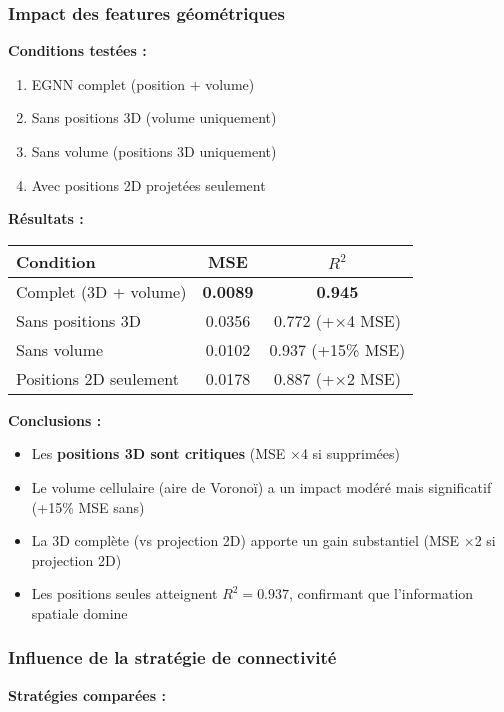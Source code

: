 \subsubsection{Impact des features géométriques}

\textbf{Conditions testées :}
\begin{enumerate}
    \item EGNN complet (position + volume)
    \item Sans positions 3D (volume uniquement)
    \item Sans volume (positions 3D uniquement)
    \item Avec positions 2D projetées seulement
\end{enumerate}

\textbf{Résultats :}
\begin{center}
\begin{tabular}{|l|c|c|}
\hline
\textbf{Condition} & \textbf{MSE} & \textbf{$R^2$} \\
\hline
Complet (3D + volume) & \textbf{0.0089} & \textbf{0.945} \\
Sans positions 3D & 0.0356 & 0.772 (+×4 MSE) \\
Sans volume & 0.0102 & 0.937 (+15\% MSE) \\
Positions 2D seulement & 0.0178 & 0.887 (+×2 MSE) \\
\hline
\end{tabular}
\end{center}

\textbf{Conclusions :}
\begin{itemize}
    \item Les \textbf{positions 3D sont critiques} (MSE ×4 si supprimées)
    \item Le volume cellulaire (aire de Voronoï) a un impact modéré mais significatif (+15\% MSE sans)
    \item La 3D complète (vs projection 2D) apporte un gain substantiel (MSE ×2 si projection 2D)
    \item Les positions seules atteignent $R^2=0.937$, confirmant que l'information spatiale domine
\end{itemize}

\subsubsection{Influence de la stratégie de connectivité}

\textbf{Stratégies comparées :}

